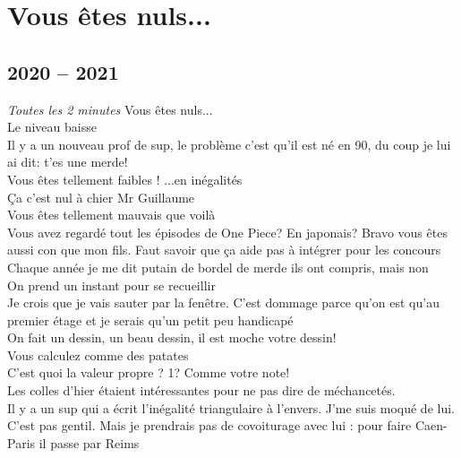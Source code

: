 \documentclass[french, a4paper, openany]{book}
\begin{document}
 \maketitle

\tableofcontents \newpage

\chapter{Vous êtes nuls...}

\section{2020 -- 2021}

	\noindent \emph{Toutes les 2 minutes} \og Vous êtes nuls... \fg \\
	\og Le niveau baisse \fg \\
	\og Il y a un nouveau prof de sup, le problème c'est qu'il est né en 90, du coup je lui ai dit: t'es une merde! \fg \\
	\og Vous êtes tellement faibles ! ...en inégalités \fg \\
	\og Ça c'est nul à chier Mr Guillaume \fg \\
	\og Vous êtes tellement mauvais que voilà \fg \\
	\og Vous avez regardé tout les épisodes de One Piece? En japonais? Bravo vous êtes aussi con que mon fils. Faut savoir que ça aide pas à intégrer pour les concours \fg \\
	\og Chaque année je me dit \fg putain de bordel de merde ils ont compris\og , mais non \fg \\
	\og On prend un instant pour se recueillir \fg \\
	\og Je crois que je vais sauter par la fenêtre. C'est dommage parce qu'on est qu'au premier étage et je serais qu'un petit peu handicapé \fg \\
	\og On fait un dessin, un beau dessin, il est moche votre dessin! \fg \\
	\og Vous calculez comme des patates \fg \\
	\og C'est quoi la valeur propre ? 1? Comme votre note! \fg \\
	\og Les colles d'hier étaient intéressantes pour ne pas dire de méchancetés. \fg \\
	\og Il y a un sup qui a écrit l'inégalité triangulaire à l'envers. J'me suis moqué de lui. C'est pas gentil. Mais je prendrais pas de covoiturage avec lui : pour faire Caen-Paris il passe par Reims \fg \\
\end{document}

